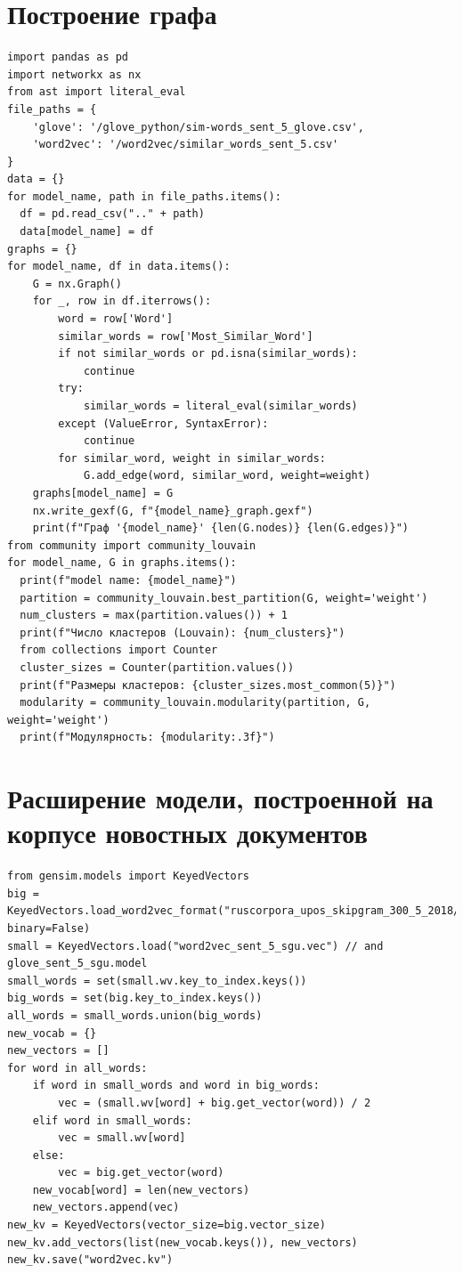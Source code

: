 \documentclass[coursework]{SCWorks}
\begin{document}
\section{Построение графа}
\label{apx:graph}
\begin{verbatim}
import pandas as pd
import networkx as nx
from ast import literal_eval
file_paths = {
    'glove': '/glove_python/sim-words_sent_5_glove.csv',
    'word2vec': '/word2vec/similar_words_sent_5.csv'
}
data = {}
for model_name, path in file_paths.items():
  df = pd.read_csv(".." + path)
  data[model_name] = df
graphs = {}
for model_name, df in data.items():
    G = nx.Graph()
    for _, row in df.iterrows():
        word = row['Word']
        similar_words = row['Most_Similar_Word']
        if not similar_words or pd.isna(similar_words):
            continue
        try:
            similar_words = literal_eval(similar_words)
        except (ValueError, SyntaxError):
            continue
        for similar_word, weight in similar_words:
            G.add_edge(word, similar_word, weight=weight)
    graphs[model_name] = G    
    nx.write_gexf(G, f"{model_name}_graph.gexf")
    print(f"Граф '{model_name}' {len(G.nodes)} {len(G.edges)}")
from community import community_louvain
for model_name, G in graphs.items():
  print(f"model name: {model_name}")
  partition = community_louvain.best_partition(G, weight='weight')
  num_clusters = max(partition.values()) + 1
  print(f"Число кластеров (Louvain): {num_clusters}")
  from collections import Counter
  cluster_sizes = Counter(partition.values())
  print(f"Размеры кластеров: {cluster_sizes.most_common(5)}")
  modularity = community_louvain.modularity(partition, G, weight='weight')
  print(f"Модулярность: {modularity:.3f}")
\end{verbatim}
\section{Расширение модели, построенной на корпусе новостных документов}
\label{apx:thesaurus-expanding}
\begin{verbatim}
from gensim.models import KeyedVectors
big = KeyedVectors.load_word2vec_format("ruscorpora_upos_skipgram_300_5_2018/model.vec", binary=False)
small = KeyedVectors.load("word2vec_sent_5_sgu.vec") // and glove_sent_5_sgu.model
small_words = set(small.wv.key_to_index.keys())
big_words = set(big.key_to_index.keys())
all_words = small_words.union(big_words)
new_vocab = {}
new_vectors = []
for word in all_words:
    if word in small_words and word in big_words:
        vec = (small.wv[word] + big.get_vector(word)) / 2
    elif word in small_words:
        vec = small.wv[word]
    else:
        vec = big.get_vector(word)
    new_vocab[word] = len(new_vectors)
    new_vectors.append(vec)
new_kv = KeyedVectors(vector_size=big.vector_size)
new_kv.add_vectors(list(new_vocab.keys()), new_vectors)
new_kv.save("word2vec.kv")
\end{verbatim}
\end{document}
